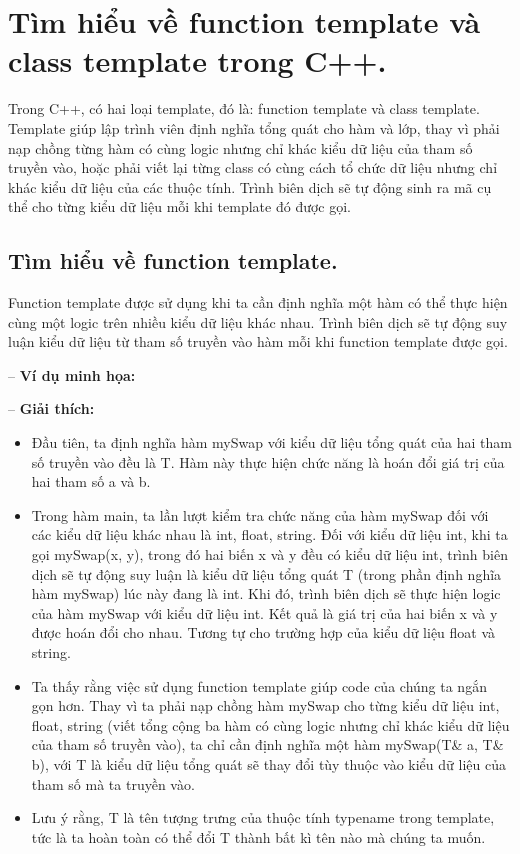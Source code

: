 \section{Tìm hiểu về function template và class template trong C++.}
Trong C++, có hai loại template, đó là: function template và class template. 
Template giúp lập trình viên định nghĩa tổng quát cho hàm và lớp, thay vì phải nạp chồng từng hàm có cùng logic nhưng chỉ khác kiểu dữ liệu của tham số truyền vào, 
hoặc phải viết lại từng class có cùng cách tổ chức dữ liệu nhưng chỉ khác kiểu dữ liệu của các thuộc tính.
Trình biên dịch sẽ tự động sinh ra mã cụ thể cho từng kiểu dữ liệu mỗi khi template đó được gọi.

\subsection{Tìm hiểu về function template.}
Function template được sử dụng khi ta cần định nghĩa một hàm có thể thực hiện cùng một logic trên nhiều kiểu dữ liệu khác nhau.
Trình biên dịch sẽ tự động suy luận kiểu dữ liệu từ tham số truyền vào hàm mỗi khi function template được gọi.

-- \textbf{Ví dụ minh họa:}


-- \textbf{Giải thích:}
\begin{itemize}
    \item[$+$] Đầu tiên, ta định nghĩa hàm mySwap với kiểu dữ liệu tổng quát của hai tham số truyền vào đều là T. 
               Hàm này thực hiện chức năng là hoán đổi giá trị của hai tham số a và b.
    \item[$+$] Trong hàm main, ta lần lượt kiểm tra chức năng của hàm mySwap đối với các kiểu dữ liệu khác nhau là int, float, string. 
               Đối với kiểu dữ liệu int, khi ta gọi mySwap(x, y), trong đó hai biến x và y đều có kiểu dữ liệu int, 
               trình biên dịch sẽ tự động suy luận là kiểu dữ liệu tổng quát T (trong phần định nghĩa hàm mySwap) lúc này đang là int. 
               Khi đó, trình biên dịch sẽ thực hiện logic của hàm mySwap với kiểu dữ liệu int. 
               Kết quả là giá trị của hai biến x và y được hoán đổi cho nhau. 
               Tương tự cho trường hợp của kiểu dữ liệu float và string.
    \item[$+$] Ta thấy rằng việc sử dụng function template giúp code của chúng ta ngắn gọn hơn. 
               Thay vì ta phải nạp chồng hàm mySwap cho từng kiểu dữ liệu int, float, string 
               (viết tổng cộng ba hàm có cùng logic nhưng chỉ khác kiểu dữ liệu của tham số truyền vào), 
               ta chỉ cần định nghĩa một hàm mySwap(T\& a, T\& b), với T là kiểu dữ liệu tổng quát sẽ thay đổi tùy thuộc vào kiểu dữ liệu của tham số mà ta truyền vào.
    \item[$+$] Lưu ý rằng, T là tên tượng trưng của thuộc tính typename trong template, tức là ta hoàn toàn có thể đổi T thành bất kì tên nào mà chúng ta muốn.
\end{itemize}

